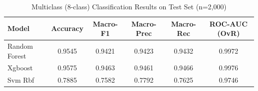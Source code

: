 \begin{table}[H]
\centering
\caption{Multiclass (8-class) Classification Results on Test Set (n=2,000)}
\label{tab:multiclass_results}
\begin{tabular}{lccccc}
\toprule
\textbf{Model} & \textbf{Accuracy} & \textbf{Macro-F1} & \textbf{Macro-Prec} & \textbf{Macro-Rec} & \textbf{ROC-AUC (OvR)} \\
\midrule
Random Forest & 0.9545 & 0.9421 & 0.9423 & 0.9432 & 0.9972 \\
Xgboost & 0.9575 & 0.9463 & 0.9461 & 0.9466 & 0.9976 \\
Svm Rbf & 0.7885 & 0.7582 & 0.7792 & 0.7625 & 0.9746 \\
\bottomrule
\end{tabular}
\end{table}